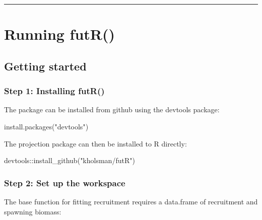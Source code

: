 \documentclass[
]{article}
\newenvironment{Shaded}{\begin{snugshade}}{\end{snugshade}}
\newcommand{\FunctionTok}[1]{\textcolor[rgb]{0.00,0.00,0.00}{#1}}
\newcommand{\NormalTok}[1]{#1}
\newcommand{\SpecialCharTok}[1]{\textcolor[rgb]{0.00,0.00,0.00}{#1}}
\newcommand{\StringTok}[1]{\textcolor[rgb]{0.31,0.60,0.02}{#1}}
\begin{document}
\begin{center}\rule{0.5\linewidth}{0.5pt}\end{center}

\hypertarget{running-futr}{%
\section{Running futR()}\label{running-futr}}

\hypertarget{getting-started}{%
\subsection{Getting started}\label{getting-started}}

\hypertarget{step-1-installing-futr}{%
\subsubsection{Step 1: Installing futR()}\label{step-1-installing-futr}}

The package can be installed from github using the devtools package:

\begin{Shaded}
\begin{Highlighting}[]
\FunctionTok{install.packages}\NormalTok{(}\StringTok{"devtools"}\NormalTok{)}
\end{Highlighting}
\end{Shaded}

The projection package can then be installed to R directly:

\begin{Shaded}
\begin{Highlighting}[]
\NormalTok{devtools}\SpecialCharTok{::}\FunctionTok{install\_github}\NormalTok{(}\StringTok{"kholsman/futR"}\NormalTok{)}
\end{Highlighting}
\end{Shaded}

\hypertarget{step-2-set-up-the-workspace}{%
\subsubsection{Step 2: Set up the
workspace}\label{step-2-set-up-the-workspace}}

The base function for fitting recruitment requires a data.frame of
recruitment and spawning biomass:
\end{document}
